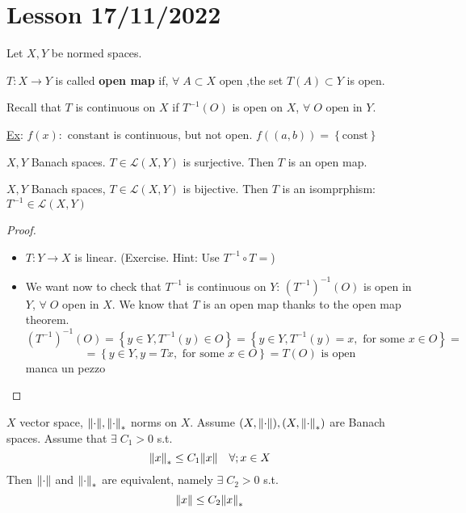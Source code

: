 \section{Lesson 17/11/2022}
Let \(X, Y\) be normed spaces.
\begin{definition}
    \(T: X \to Y\) is called \textbf{open map} if, \(\forall \; A \subset X \mbox{ open }\),the set \(T(A)\subset Y\) is open.
\end{definition}
\begin{remark}
    Recall that \(T\) is continuous on \(X\) if \(T^{-1}(O)\) is open on \(X\), \(\forall \; O \mbox{ open in } Y\).
\end{remark}
\underline{Ex}: \(f(x) : \mbox{ constant}\) is continuous, but not open. \(f((a,b)) = \left\{ \mbox{const} \right\}\)
\begin{theorem}
    \(X, Y\) Banach spaces. \(T \in \mathcal{L}(X,Y)\) is surjective. Then \(T\) is an open map.
\end{theorem}
\begin{corollary}
    \(X,Y\) Banach spaces, \(T \in \mathcal{L}(X,Y)\) is bijective. Then \(T\) is an isomprphism: \(T^{-1} \in \mathcal{L}(X,Y)\)
\end{corollary}
\begin{proof}
    \begin{itemize}
        \item \(T : Y \to X\) is linear. (Exercise. Hint: Use \(T^{-1} \circ T = \))
        \item We want now to check that \(T^{-1}\) is continuous on \(Y\): \((T^{-1})^{-1}(O)\) is open in \(Y\), \(\forall \; O\) open in \(X\). We know that \(T\) is an open map thanks to the open map theorem.
        \[
            (T^{-1})^{-1}(O) = \left\{ y \in Y, T^{-1}(y) \in O \right\} = \left\{ y \in Y, T^{-1}(y) = x, \mbox{ for some } x \in O \right\} =
        \]
        \[
            = \left\{ y \in Y, y = Tx, \mbox{ for some } x \in O\right\} = T(O) \mbox{ is open}
        \]
        manca un pezzo
    \end{itemize}
\end{proof}
\begin{corollary}
    \(X\) vector space, \(\norm{\cdot}, \norm{\cdot}_*\) norms on \(X\). Assume \((X, \norm{\cdot}), (X, \norm{\cdot}_*)\) are Banach spaces. 
    Assume that \(\exists \; C_1 > 0\) s.t. 
    \[
        \norm{x}_* \leq C_1\norm{x} \quad \forall ; x \in X
    \]
    Then \(\norm{\cdot}\) and \(\norm{\cdot}_*\) are equivalent, namely \(\exists \; C_2 > 0\) s.t. 
    \[
        \norm{x} \leq C_2 \norm{x}_*
    \]
\end{corollary}

